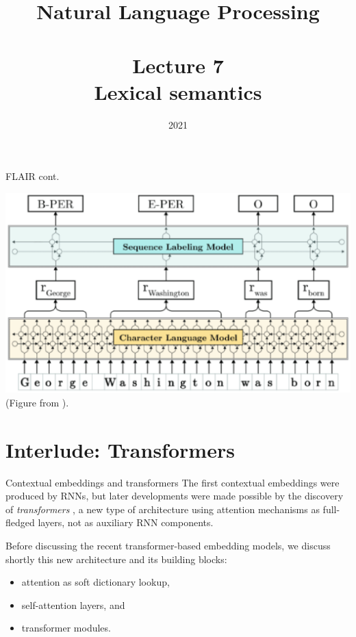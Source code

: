 \documentclass[style=upen, size=14pt]{powerdot}
\newcommand{\gold}{\color{arany}}
\theoremstyle{definition}
\begin{document}
\title{Natural Language Processing\\~~\\Lecture 7\\Lexical semantics}

\date{2021}
\maketitle

\begin{slide}[toc=]{FLAIR cont.}
  \begin{center}
    \includegraphics[width=1\textwidth]{figures/flair.eps}
    \footnotesize{(Figure from \cite{akbik2018contextual}).}
  \end{center}
\end{slide}

\section[toc=Transformers]{Interlude: Transformers}

\begin{slide}[toc=Introduction]{Contextual embeddings and transformers}
  The first contextual embeddings were produced by RNNs, but later developments
  were made possible by the discovery of \emph{\gold transformers}
  \citep{vaswani2017attention}, a new type of architecture using attention
  mechanisms as full-fledged layers, not as auxiliary RNN components.\bigskip

  Before discussing the recent transformer-based embedding models, we discuss
  shortly this new architecture and its building blocks:
  \begin{itemize}
  \item attention as soft dictionary lookup,
  \item self-attention layers, and
  \item transformer modules.
  \end{itemize}
\end{slide}
\end{document}
